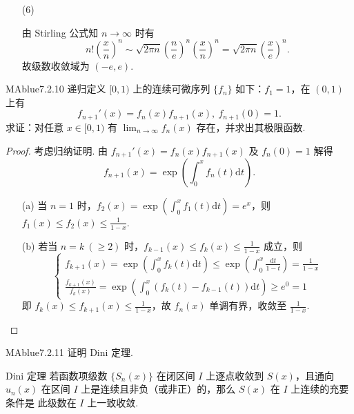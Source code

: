 \begin{enumerate}
    \item[(6)]
    \begin{solution}
        由 Stirling 公式知 $n \to \infty$ 时有
        \[
            n! \left( \frac x n \right)^n \sim \sqrt{2 \pi n} \left( \frac n e \right)^n \left( \frac x n \right)^n = \sqrt{2 \pi n} \left( \frac x e \right)^n.
        \]
        故级数收敛域为 $(-e, e)$.
    \end{solution}
\end{enumerate}

\begin{problem}{MAblue}{7.2.10}
    递归定义 $[0, 1)$ 上的连续可微序列 $\{ f_n \}$ 如下：$f_1 = 1$，在 $(0, 1)$ 上有
    \[
        f_{n+1}'(x) = f_n(x)f_{n+1}(x),\ f_{n+1}(0) = 1.
    \]
    求证：对任意 $x \in [0, 1)$ 有 $\lim_{n \to \infty} f_n(x)$ 存在，并求出其极限函数.
\end{problem}

\begin{proof}
    考虑归纳证明. 由 $f_{n+1}'(x) = f_n(x) f_{n+1}(x)$ 及 $f_n(0) = 1$ 解得
    \[
        f_{n+1}(x) = \exp\left( \int_0^x f_n(t) \mathrm dt \right).
    \]
    \begin{enumerate}
        \item[(a)]
        当 $n = 1$ 时，$f_2(x) = \exp\left( \int_0^x f_1(t) \mathrm dt \right) = e^x$，则 $f_1(x) \leqslant f_2(x) \leqslant \frac 1 {1 - x}$.
        \item[(b)]
        若当 $n = k \ (\geqslant 2)$ 时，$f_{k-1}(x) \leqslant f_k(x) \leqslant \frac 1 {1 - x}$ 成立，则
        \[
            \begin{cases}
                f_{k+1}(x) = \exp\left( \int_0^x f_k(t) \mathrm dt \right) \leqslant \exp\left( \int_0^x \frac{\mathrm dt}{1 - t} \right) = \frac 1 {1 - x} \\
                \frac{f_{k+1}(x)}{f_k(x)} = \exp\left( \int_0^x \left( f_k(t) - f_{k-1}(t) \right) \mathrm dt \right) \geqslant e^0 = 1
            \end{cases}
        \]
        即 $f_k(x) \leqslant f_{k+1}(x) \leqslant \frac 1 {1 - x}$，故 $f_n(x)$ 单调有界，收敛至 $\frac 1 {1-x}$.
    \end{enumerate}
\end{proof}

\begin{problem}{MAblue}{7.2.11}
    证明 Dini 定理.
\end{problem}

\begin{center}
    \begin{minipage}{0.85\textwidth}
        \begin{theorem}{Dini 定理}{}
            若函数项级数 $\{ S_n(x) \}$ 在闭区间 $I$ 上逐点收敛到 $S(x)$，且通向 $u_n(x)$ 在区间 $I$ 上是连续且非负（或非正）的，那么 $S(x)$ 在 $I$ 上连续的充要条件是 此级数在 $I$ 上一致收敛.
        \end{theorem}
    \end{minipage}
\end{center}

